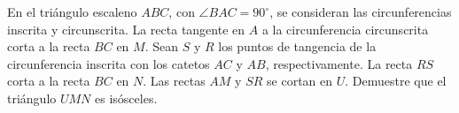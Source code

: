 En el triángulo escaleno $ABC$, con $\angle BAC = 90^{\circ}$, se consideran las circunferencias inscrita y circunscrita. La recta tangente en $A$ a la circunferencia circunscrita corta a la recta $BC$ en $M$. Sean $S$ y $R$ los puntos de tangencia de la circunferencia inscrita con los catetos $AC$ y $AB$, respectivamente. La recta $RS$ corta a la recta $BC$ en $N$. Las rectas $AM$ y $SR$ se cortan en $U$. Demuestre que el triángulo $UMN$ es isósceles.
